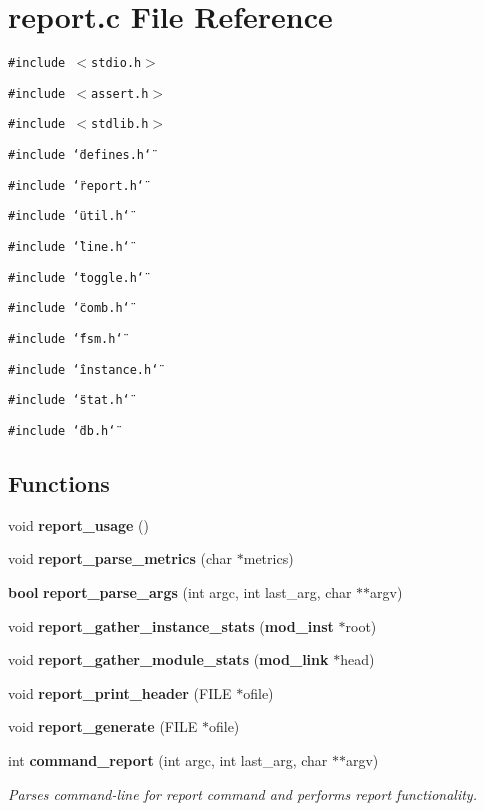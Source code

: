 \section{report.c File Reference}
\label{report_8c}
{\tt \#include $<$stdio.h$>$}\par
{\tt \#include $<$assert.h$>$}\par
{\tt \#include $<$stdlib.h$>$}\par
{\tt \#include \char`\"{}defines.h\char`\"{}}\par
{\tt \#include \char`\"{}report.h\char`\"{}}\par
{\tt \#include \char`\"{}util.h\char`\"{}}\par
{\tt \#include \char`\"{}line.h\char`\"{}}\par
{\tt \#include \char`\"{}toggle.h\char`\"{}}\par
{\tt \#include \char`\"{}comb.h\char`\"{}}\par
{\tt \#include \char`\"{}fsm.h\char`\"{}}\par
{\tt \#include \char`\"{}instance.h\char`\"{}}\par
{\tt \#include \char`\"{}stat.h\char`\"{}}\par
{\tt \#include \char`\"{}db.h\char`\"{}}\par
\subsection*{Functions}
\begin{CompactItemize}
\item 
void {\bf report\_\-usage} ()
\item 
void {\bf report\_\-parse\_\-metrics} (char $\ast$metrics)
\item 
{\bf bool} {\bf report\_\-parse\_\-args} (int argc, int last\_\-arg, char $\ast$$\ast$argv)
\item 
void {\bf report\_\-gather\_\-instance\_\-stats} ({\bf mod\_\-inst} $\ast$root)
\item 
void {\bf report\_\-gather\_\-module\_\-stats} ({\bf mod\_\-link} $\ast$head)
\item 
void {\bf report\_\-print\_\-header} (FILE $\ast$ofile)
\item 
void {\bf report\_\-generate} (FILE $\ast$ofile)
\item 
int {\bf command\_\-report} (int argc, int last\_\-arg, char $\ast$$\ast$argv)
\begin{CompactList}\small\item\em Parses command-line for report command and performs report functionality.\item\end{CompactList}\end{CompactItemize}
